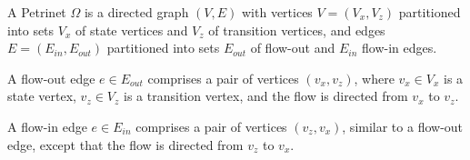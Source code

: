 \begin{definition}
    A Petrinet $\Omega$ is a directed graph $(V, E)$ with vertices $V=(V_x,
    V_z)$ partitioned into sets $V_x$ of state vertices and $V_z$ of transition
    vertices, and edges $E=(E_{in}, E_{out})$ partitioned into sets $E_{out}$ of
    flow-out and $E_{in}$ flow-in edges. 
\end{definition}

\begin{definition}
A flow-out edge $e \in E_{out}$ comprises a pair of vertices $(v_x,v_z)$, where
$v_x \in V_x$ is a state vertex, $v_z \in V_z$ is a transition vertex, and the
flow is directed from $v_x$ to $v_z$.  
\end{definition}

\begin{definition}
    A flow-in edge $e \in E_{in}$ comprises a pair of vertices $(v_z,v_x)$,
    similar to a flow-out edge, except that the flow is directed from $v_z$ to
    $v_x$.  
\end{definition}



